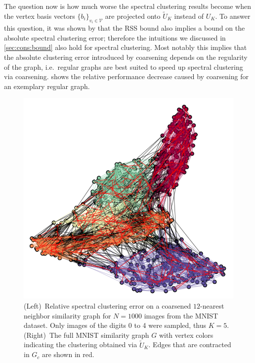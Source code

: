 The question now is how much worse the spectral clustering results become when the vertex basis vectors ${\{ b_i \}}_{v_i \in \mathcal{V}}$ are projected onto $\widetilde{U}_K$ instead of $U_K$.
To answer this question, it was shown by \citet[Coroll.~5.1]{Loukas2018} that the RSS bound also implies a bound on the absolute spectral clustering error;
therefore the intuitions we discussed in \cref{sec:cons:bound} also hold for spectral clustering.
Most notably this implies that the absolute clustering error introduced by coarsening depends on the regularity of the graph, i.e.\ regular graphs are best suited to speed up spectral clustering via coarsening.
 shows the relative performance decrease caused by coarsening for an exemplary regular graph.
\begin{figure}[ht]
	\centering
	\quad\includegraphics[width=0.29\linewidth]{gfx/cons/mnistGraph.png}
	\caption{%
		(Left)~Relative spectral clustering error on a coarsened $12$-nearest neighbor similarity graph for $N=1000$ images from the MNIST dataset.
		Only images of the digits 0 to 4 were sampled, thus $K = 5$.
		(Right)~The full MNIST similarity graph $G$ with vertex colors indicating the clustering obtained via $\widetilde{U}_K$. Edges that are contracted in $G_c$ are shown in red.
	}\label{fig:cons:mnist}
\end{figure}
